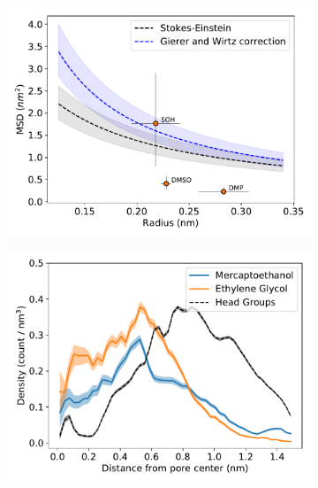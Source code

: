 \documentclass[journal=jpcbfk,manuscript=article]{achemso}
\begin{document}
  \begin{figure}[!htb]
  \centering
  \begin{subfigure}{0.45\linewidth}
  \includegraphics[width=\textwidth]{msd_radius_sulfur_10wt.pdf}
  \caption{}\label{fig:SOH_GCL_comparison}
  \end{subfigure}
  \begin{subfigure}{0.45\linewidth}
  \includegraphics[width=\textwidth]{thiol_comparison_SOH.pdf}
  \caption{}\label{fig:SOH_GCL_comparison}
  \end{subfigure}
  \begin{subfigure}{0.45\linewidth}

\end{subfigure}
\end{figure}
\end{document}
